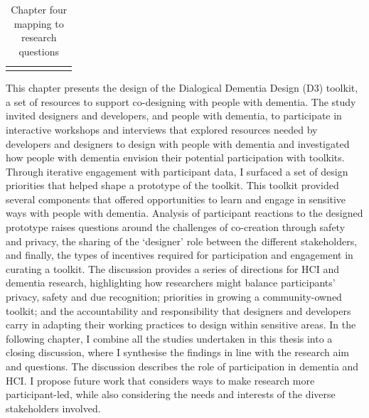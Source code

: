 \begin{table}[htp]
\begin{tabular}{p{0.15\linewidth} | p{0.8\linewidth}}
\begin{itemize}
      \end{itemize}
    \\ 
    
    \end{tabular}
    \caption{Chapter four mapping to research questions}
    \label{chapterFourRQ}
\end{table}

\pagebreak

This chapter presents the design of the Dialogical Dementia Design (D3) toolkit, a set of resources to support co-designing with people with dementia. The study invited designers and developers, and people with dementia, to participate in interactive workshops and interviews that explored resources needed by developers and designers to design with people with dementia and investigated how people with dementia envision their potential participation with toolkits. Through iterative engagement with participant data, I surfaced a set of design priorities that helped shape a prototype of the toolkit. This toolkit provided several components that offered opportunities to learn and engage in sensitive ways with people with dementia. Analysis of participant reactions to the designed prototype raises questions around the challenges of co-creation through safety and privacy, the sharing of the ‘designer’ role between the different stakeholders, and finally, the types of incentives required for participation and engagement in curating a toolkit. The discussion provides a series of directions for HCI and dementia research, highlighting how researchers might balance participants' privacy, safety and due recognition; priorities in growing a community-owned toolkit; and the accountability and responsibility that designers and developers carry in adapting their working practices to design within sensitive areas. In the following chapter, I combine all the studies undertaken in this thesis into a closing discussion, where I synthesise the findings in line with the research aim and questions. The discussion describes the role of participation in dementia and HCI. I propose future work that considers ways to make research more participant-led, while also considering the needs and interests of the diverse stakeholders involved.
